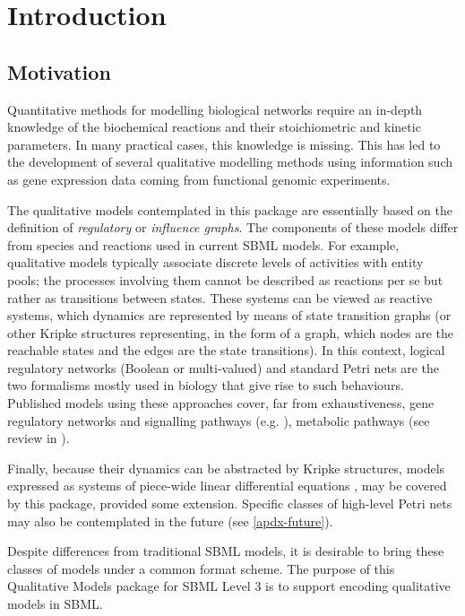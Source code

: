 
\section{Introduction}
\label{intro}

\subsection{Motivation}

Quantitative methods for modelling biological networks require an
in-depth knowledge of the biochemical reactions and their stoichiometric
and kinetic parameters. In many practical cases, this knowledge is
missing. This has led to the development of several qualitative
modelling methods using information such as gene expression data coming
from functional genomic experiments.

The qualitative models contemplated in this package are essentially
based on the definition of \emph{regulatory} or \emph{influence
  graphs}. The components of these models differ from species and
reactions used in current SBML models. For example, qualitative models
typically associate discrete levels of activities with entity pools; the
processes involving them cannot be described as reactions per se but
rather as transitions between states. These systems can be viewed as
reactive systems, which dynamics are represented by means of state
transition graphs (or other Kripke structures representing, in the form
of a graph, which nodes are the reachable states and the edges are the
state transitions). In this context, logical regulatory networks
(Boolean or multi-valued) \cite{kauffman69,thomas91} and standard Petri
nets \cite{chaouiya07} are the two formalisms mostly used in biology
that give rise to such behaviours. Published models using these approaches cover, far from exhaustiveness, gene regulatory networks and signalling pathways (e.g. \cite{thieffry95,sanchez03,albert03,faure06,mendoza06,helikar08,naldi10,calzone10}), metabolic pathways (see review in \cite{chaouiya07}). 

Finally, because their dynamics can be abstracted by Kripke structures, models expressed as systems of piece-wide linear differential equations \cite{batt05}, may be covered by this package, provided some extension. Specific classes of high-level Petri nets may also be contemplated in the future (see \ref{apdx-future}).

 Despite differences from traditional SBML models, it is desirable to
 bring these classes of models under a common format scheme. The purpose
 of this Qualitative Models package for SBML Level 3 is to support
 encoding qualitative models in SBML.

